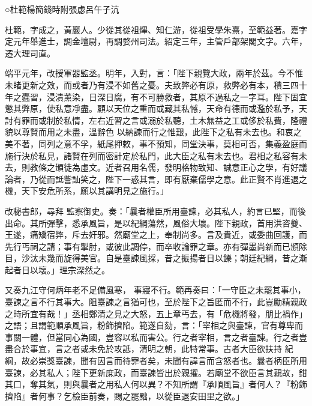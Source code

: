 
\begin{pinyinscope}

 ○杜範楊簡錢時附張虙呂午子沆



 杜範，字成之，黃巖人。少從其從祖熚、知仁游，從祖受學朱熹，至範益著。嘉字定元年舉進士，調金壇尉，再調婺州司法。紹定三年，主管戶部架閣文字。六年，遷大理司直。



 端平元年，改授軍器監丞。明年，入對，言：「陛下親覽大政，兩年於茲。今不惟未睹更新之效，而或者乃有浸不如舊之憂。夫致弊必有原，救弊必有本，積三四十年之蠹習，浸漬薰染，日深日腐，有不可勝救者，其原不過私之一字耳。陛下固宜懲其弊原，使私意凈盡。顧以天位之重而或藏其私憾，天命有德而或濫於私予，天討有罪而或制於私情，左右近習之言或溺於私聽，土木無益之工或侈於私費，隆禮貌以尊賢而用之未盡，溫辭色
 以納諫而行之惟艱，此陛下之私有未去也。和衷之美不著，同列之意不孚，紙尾押敕，事不預知，同堂決事，莫相可否，集義盈庭而施行決於私見，諸賢在列而密計定於私門，此大臣之私有末去也。君相之私容有未去，則教條之頒徒為虛文。近者召用名儒，發明格物致知、誠意正心之學，有好議論者，乃從而詆訾訕笑之，陛下一惑其言，即有厭棄儒學之意。此正賢不肖進退之機，天下安危所系，願以其講明見之施行。」



 改秘書郎，尋拜
 監察御史。奏：「曩者權臣所用臺諫，必其私人，約言已堅，而後出命。其所彈擊，悉承風旨，是以紀綱蕩然，風俗大壞。陛下親政，首用洪咨夔、王遂，痛矯宿弊，斥去奸邪。然廟堂之上，奉制尚多。言及貴近，或委曲回護，而先行丐祠之請；事有掣肘，或彼此調停，而卒收論罪之章。亦有彈墨尚新而已頒除目，沙汰未幾而旋得美官。自是臺諫風採，昔之振揚者日以鑠；朝廷紀綱，昔之漸起者日以壞。」理宗深然之。



 又奏九江守何炳年老不足備風寒，
 事寢不行。範再奏曰：「一守臣之未罷其事小，臺諫之言不行其事大。阻臺諫之言猶可也，至於陛下之旨匿而不行，此豈勵精親政之時所宜有哉！」丞相鄭清之見之大怒，五上章丐去，有「危機將發，朋比禍作」之語；且謂範順承風旨，粉飾擠陷。範遂自劾，言：「宰相之與臺諫，官有尊卑而事關一體，但當同心為國，豈容以私而害公。行之者宰相，言之者臺諫。行之者豈盡合於事宜，言之者或未免於攻詆，清明之朝，此特常事。古者大臣欲扶持
 紀綱，故必崇獎臺諫，聞有因言而待罪者矣，未聞有諱言而含怒者也。曩者柄臣所用臺諫，必其私人；陛下更新庶政，而臺諫皆出於親擢。若廟堂不欲臣言其親故，鉗其口，奪其氣，則與曩者之用私人何以異？不知所謂『承順風旨』者何人？『粉飾擠陷』者何事？乞檢臣前奏，賜之罷黜，以從臣退安田里之欲。」




\end{pinyinscope}
